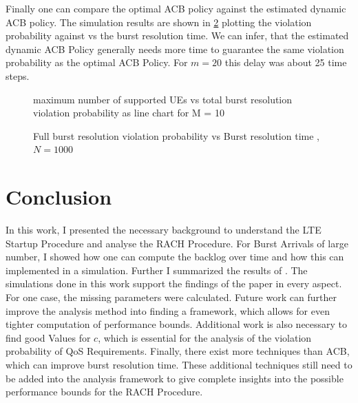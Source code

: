 \documentclass[conference]{IEEEtran}
\begin{document}
Finally one can compare the optimal ACB policy against the estimated dynamic ACB policy.
The simulation results are shown in \ref{fig:5} plotting the violation probability against vs the burst resolution time.
We can infer, that the estimated dynamic ACB Policy generally needs more time to guarantee the same violation probability as the optimal ACB Policy.
For $m = 20$ this delay was about 25 time steps.
\begin{figure}
\resizebox{\columnwidth}{!}{}
    \caption{maximum number of supported UEs vs total burst resolution violation probability as line chart for M = {10}}\label{fig:max UEs supported}
\end{figure}
\begin{figure}
\resizebox{\columnwidth}{!}{}
    \caption{Full burst resolution violation probability vs Burst resolution time , $N= 1000$}\label{fig:5}
\end{figure}

\section{Conclusion}
In this work, I presented the necessary background to understand the LTE Startup Procedure and analyse the RACH Procedure.
For Burst Arrivals of large number, I showed how one can compute the backlog over time and how this can implemented in a simulation.
Further I summarized the results of \cite{8422323}.
The simulations done in this work support the findings of the paper in every aspect.
For one case, the missing parameters were calculated.
Future work can further improve the analysis method into finding a framework, which allows for even tighter computation of performance bounds.
Additional work is also necessary to find good Values for $c$, which is essential for the analysis of the violation probability of QoS Requirements.
Finally, there exist more techniques than ACB, which can improve burst resolution time.
These additional techniques still need to be added into the analysis framework to give complete insights into the possible performance bounds for the RACH Procedure.


\end{document}
